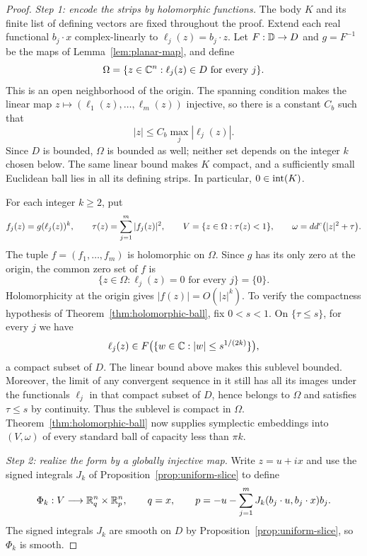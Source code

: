 \begin{proof}
\noindent\textit{Step 1: encode the strips by holomorphic functions.}
The body $K$ and its finite list of defining vectors are fixed throughout
the proof. Extend each real functional $b_j\cdot x$ complex-linearly to
$\ell_j(z)=b_j\cdot z$. Let $F:\mathbb D\to D$ and $g=F^{-1}$ be the maps of
Lemma~\ref{lem:planar-map}, and define
\begin{equation}\label{eq:strip-domain}
 \Omega=\{z\in\mathbb C^n:\ell_j(z)\in D\text{ for every }j\}.
\end{equation}
This is an open neighborhood of the origin. The spanning condition makes
the linear map $z\mapsto(\ell_1(z),\ldots,\ell_m(z))$ injective, so there
is a constant $C_b$ such that
\[
 |z|\le C_b\max_j|\ell_j(z)|.
\]
Since $D$ is bounded, $\Omega$ is bounded as well; neither set depends on
the integer $k$ chosen below. The same linear bound makes $K$ compact,
and a sufficiently small Euclidean ball lies in all its defining strips.
In particular, $0\in\operatorname{int}(K)$.

For each integer $k\ge2$, put
\[
 f_j(z)=g(\ell_j(z))^k,\qquad
 \tau(z)=\sum_{j=1}^m|f_j(z)|^2,\qquad
 V=\{z\in\Omega:\tau(z)<1\},\qquad
 \omega=dd^c\bigl(|z|^2+\tau\bigr).
\]
The tuple $f=(f_1,\ldots,f_m)$ is holomorphic on $\Omega$. Since $g$ has
its only zero at the origin, the common zero set of $f$ is
\[
 \{z\in\Omega:\ell_j(z)=0\text{ for every }j\}=\{0\}.
\]
Holomorphicity at the origin gives $|f(z)|=O(|z|^k)$. To verify the
compactness hypothesis of Theorem~\ref{thm:holomorphic-ball}, fix
$0<s<1$. On $\{\tau\le s\}$, for every $j$ we have
\[
 \ell_j(z)\in
 F\bigl(\{w\in\mathbb C:|w|\le s^{1/(2k)}\}\bigr),
\]
a compact subset of $D$. The linear bound above makes this sublevel
bounded. Moreover, the limit of any convergent sequence in it still has
all its images under the functionals $\ell_j$ in that compact subset
of $D$, hence belongs to
$\Omega$ and satisfies $\tau\le s$ by continuity. Thus the sublevel is
compact in $\Omega$. Theorem~\ref{thm:holomorphic-ball} now supplies
symplectic embeddings into $(V,\omega)$ of every standard ball of
capacity less than $\pi k$.

\medskip
\noindent\textit{Step 2: realize the form by a globally injective map.}
Write $z=u+ix$ and use the signed integrals $J_k$ of
Proposition~\ref{prop:uniform-slice} to define
\begin{equation}\label{eq:strip-phase-map}
 \Phi_k:V\longrightarrow\mathbb R^n_q\times\mathbb R^n_p,
 \qquad
 q=x,\qquad
 p=-u-\sum_{j=1}^m
       J_k(b_j\cdot u,b_j\cdot x)b_j.
\end{equation}
The signed integrals $J_k$ are smooth on $D$ by
Proposition~\ref{prop:uniform-slice}, so $\Phi_k$ is smooth.


\end{proof}
